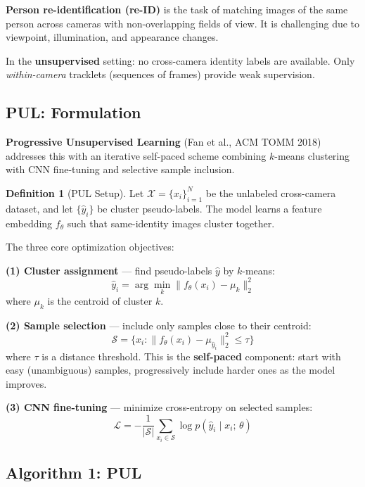 \documentclass[11pt,a4paper]{article}
\theoremstyle{definition}
\newtheorem{definition}{Definition}[section]
\theoremstyle{plain}
\theoremstyle{remark}
\begin{document}
\textbf{Person re-identification (re-ID)} is the task of matching images of the same person across cameras with non-overlapping fields of view. It is challenging due to viewpoint, illumination, and appearance changes.

In the \textbf{unsupervised} setting: no cross-camera identity labels are available. Only \emph{within-camera} tracklets (sequences of frames) provide weak supervision.

\subsection{PUL: Formulation}

\textbf{Progressive Unsupervised Learning} (Fan et al., ACM TOMM 2018) addresses this with an iterative self-paced scheme combining $k$-means clustering with CNN fine-tuning and selective sample inclusion.

\begin{definition}[PUL Setup]
Let $\mathcal{X} = \{x_i\}_{i=1}^N$ be the unlabeled cross-camera dataset, and let $\{\hat{y}_i\}$ be cluster pseudo-labels. The model learns a feature embedding $f_\theta$ such that same-identity images cluster together.
\end{definition}

The three core optimization objectives:

\textbf{(1) Cluster assignment} --- find pseudo-labels $\hat{y}$ by $k$-means:
\begin{equation}
    \hat{y}_i = \arg\min_{k} \| f_\theta(x_i) - \mu_k \|_2^2
\end{equation}
where $\mu_k$ is the centroid of cluster $k$.

\textbf{(2) Sample selection} --- include only samples close to their centroid:
\begin{equation}
    \mathcal{S} = \{ x_i : \| f_\theta(x_i) - \mu_{\hat{y}_i} \|_2^2 \leq \tau \}
\end{equation}
where $\tau$ is a distance threshold. This is the \textbf{self-paced} component: start with easy (unambiguous) samples, progressively include harder ones as the model improves.

\textbf{(3) CNN fine-tuning} --- minimize cross-entropy on selected samples:
\begin{equation}
    \mathcal{L} = -\frac{1}{|\mathcal{S}|} \sum_{x_i \in \mathcal{S}} \log p(\hat{y}_i \mid x_i;\,\theta)
\end{equation}

\subsection{Algorithm 1: PUL}
\end{document}
